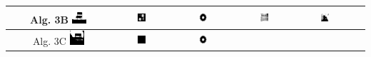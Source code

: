 \begin{table}
\centering
\begin{tabular}{cccccc}\hline
Alg. 3B\quad
\includegraphics[width=0.15\textwidth]{img/res/e3a/alg3btipo-chair.jpg} &
\includegraphics[width=0.15\textwidth]{img/res/e3a/alg3btipo-block.jpg} &
\includegraphics[width=0.15\textwidth]{img/res/e3a/alg3btipo-02.jpg} &
\includegraphics[width=0.15\textwidth]{img/res/e3a/alg3btipo-09.jpg} &
\includegraphics[width=0.15\textwidth]{img/res/e3a/alg3btipo-07.jpg}\\\hline
Alg. 3C\quad     
\includegraphics[width=0.15\textwidth]{img/res/e3a/alg3ctipo-chair.jpg} &
\includegraphics[width=0.15\textwidth]{img/res/e3a/alg3ctipo-block.jpg} &
\includegraphics[width=0.15\textwidth]{img/res/e3a/alg3btipo-02.jpg} &

\end{tabular}
\end{table}
